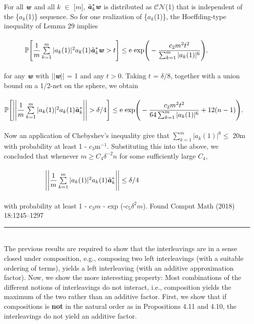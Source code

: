 \documentclass[20]{article}
\begin{document}
	For all $\textbf{\textit{w}}$ and all $\textit{k}$ $\in$ [$\textit{m}$], $\tilde{\textbf{\textit{a}}}_k^*\textbf{\textit{w}}$ is distributed as $\mathcal{C}\mathcal{N}$(1) that is independent of the \{$a_k$(1)\} sequence. So for one realization of \{$a_k$(1)\}, the Hoeffding-type inequality of Lemma 29 implies\\\\
	$\indent\indent
	\mathbb{P}\Bigg[
		\dfrac{1}{m}\sum\limits_{k=1}^{m}|a_k(1)|^2a_k(1)\tilde{\textbf{\textit{a}}}_k^*\textbf{\textit{w}} > t
	\Bigg]
	\leq
	\textnormal{e} \hspace{3pt} \textnormal{exp}
	\Bigg( 
		-\dfrac{c_2m^2t^2}{\sum_{k=1}^m|a_k(1)|^6}
	\Bigg).$\\\\
	for any $\textit{\textbf{w}}$ with $||\textit{\textbf{w}}||$ = 1 and any $t > 0$. Taking $t$ = $\delta$/8, together with a union bound on a 1/2-net on the sphere, we obtain\\\\
	$\mathbb{P}
	\Bigg[
		\Bigg|\Bigg|
			\dfrac{1}{m}\sum\limits_{k=1}^{m}|a_k(1)|^2a_k(1)\tilde{\textbf{\textit{a}}}_k^*
		\Bigg|\Bigg|
		 > \delta/4
	\Bigg]
	\leq \textnormal{e} \hspace{3pt} \textnormal{exp}
	\Bigg(
		-\dfrac{c_2m^2t^2}{64\sum_{k=1}^m|a_k(1)|^6}+12(n-1)
	\Bigg).
	$\\\\
	Now an application of Chebyshev's inequality give that $\sum_{k=1}^m|a_k(1)|^6 \leq$ 20m with probability at least 1 - $c_3$m$^{-1}$. Substituting this into the above, we concluded that whenever $m \geq C_4\delta^{-2}n$ for some sufficiently large $C_4$,\\\\
	$\indent\indent\indent\indent
	\Bigg|\Bigg|
		\dfrac{1}{m}\sum\limits_{k=1}^{m}|a_k(1)|^2a_k(1)\tilde{\textbf{\textit{a}}}_k^*
	\Bigg|\Bigg|
	\leq
	\delta/4$\\\\
	with probability at least 1 - $c_3m$ - exp (-$c_5\delta^2\textit{m}$).
	\newpage
	 \hfill Found Comput Math (2018) 18:1245--1297\\
	\rule{\textwidth}{0.4pt}\\
	\indent The previous results are required to show that the interleavings are in a sense closed under composition, e.g., composing two left interleavings (with a suitable ordering of terms), yields a left interleaving (with an additive approximation factor). Now, we show the more interesting property: Most combinations of the different notions of interleavings do not interact, i.e., composition yields the maximum of the two rather than an additive factor. First, we show that if compositions is \textbf{not} in the natural order as in Propositions 4.11 and 4.10, the interleavings do not yield an additive factor.\\\\
\end{document}
